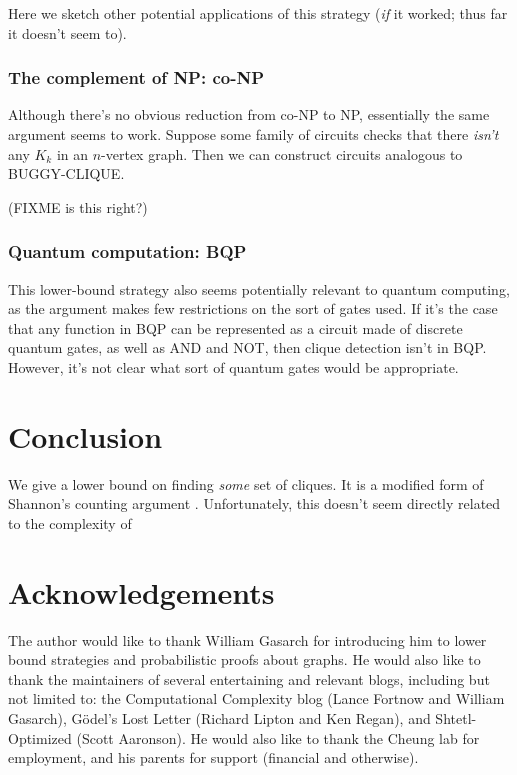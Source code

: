 \documentclass[12pt]{article}
\theoremstyle{definition}
\begin{document}
Here we sketch other potential applications of this strategy
({\em if} it worked; thus far it doesn't seem to).

\subsubsection{The complement of NP: co-NP}

Although there's no obvious reduction from co-NP to NP, essentially
the same argument seems to work. Suppose some family of circuits
checks that there {\em isn't} any $K_k$ in an $n$-vertex graph.
Then we can construct circuits analogous to BUGGY-CLIQUE.

(FIXME is this right?)

\subsubsection{Quantum computation: BQP}

This lower-bound strategy also seems potentially
relevant to quantum computing,
as the argument makes few restrictions on the sort of gates used.
If it's the case that any function in BQP can be represented
as a circuit made of discrete quantum gates, as well as AND and NOT,
then clique detection isn't in BQP.
However, it's not clear what sort of quantum gates would be
appropriate.

\section{Conclusion}

We give a lower bound on finding {\em some} set of cliques.
It is a modified form of Shannon's counting argument
\cite{shannon_synthesis_1949}. Unfortunately,
this doesn't seem directly related to the
complexity of 

\section{Acknowledgements}

The author would like to thank William Gasarch for introducing him
to lower bound strategies and probabilistic proofs about graphs.
He would also like to thank the maintainers of
several entertaining and relevant blogs, including but
not limited to: the Computational Complexity blog
(Lance Fortnow and William Gasarch), 
G\"odel's Lost Letter (Richard Lipton and Ken Regan),
and Shtetl-Optimized (Scott Aaronson). 
He would
also like to thank the Cheung lab for
employment, and his parents for support
(financial and otherwise).



\end{document}
